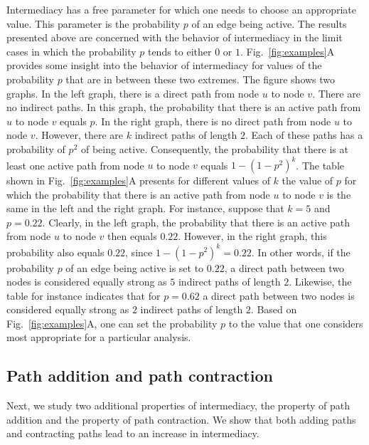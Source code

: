 \documentclass[9pt,twocolumn,twoside,lineno]{pnas-alt}
\theoremstyle{definition}
\newcommand{\subfigref}[2]{Fig.~\ref{fig:#1}#2\xspace}
\begin{document}
Intermediacy has a free parameter for which one needs to choose an appropriate value. This parameter is the probability $p$ of an edge being active. The results presented above are concerned with the behavior of intermediacy in the limit cases in which the probability $p$ tends to either $0$ or $1$. \subfigref{examples}{A} provides some insight into the behavior of intermediacy for values of the probability $p$ that are in between these two extremes. The figure shows two graphs. In the left graph, there is a direct path from node $u$ to node $v$. There are no indirect paths. In this graph, the probability that there is an active path from $u$ to node $v$ equals $p$. In the right graph, there is no direct path from node $u$ to node $v$. However, there are $k$ indirect paths of length $2$. Each of these paths has a probability of $p^2$ of being active. Consequently, the probability that there is at least one active path from node $u$ to node $v$ equals $1 - (1 - p^2)^k$. The table shown in \subfigref{examples}{A} presents for different values of $k$ the value of $p$ for which the probability that there is an active path from node $u$ to node $v$ is the same in the left and the right graph. For instance, suppose that $k = 5$ and $p = 0.22$. Clearly, in the left graph, the probability that there is an active path from node $u$ to node $v$ then equals $0.22$. However, in the right graph, this probability also equals $0.22$, since $1 - (1 - p^2)^k = 0.22$. In other words, if the probability $p$ of an edge being active is set to $0.22$, a direct path between two nodes is considered equally strong as $5$ indirect paths of length $2$. Likewise, the table for instance indicates that for $p = 0.62$ a direct path between two nodes is considered equally strong as $2$ indirect paths of length $2$. Based on \subfigref{examples}{A}, one can set the probability $p$ to the value that one considers most appropriate for a particular analysis.

%
%

\subsection*{\label{sec:path}Path addition and path contraction}

Next, we study two additional properties of intermediacy, the property of path addition and the property of path contraction. We show that both adding paths and contracting paths lead to an increase in intermediacy.
\end{document}
